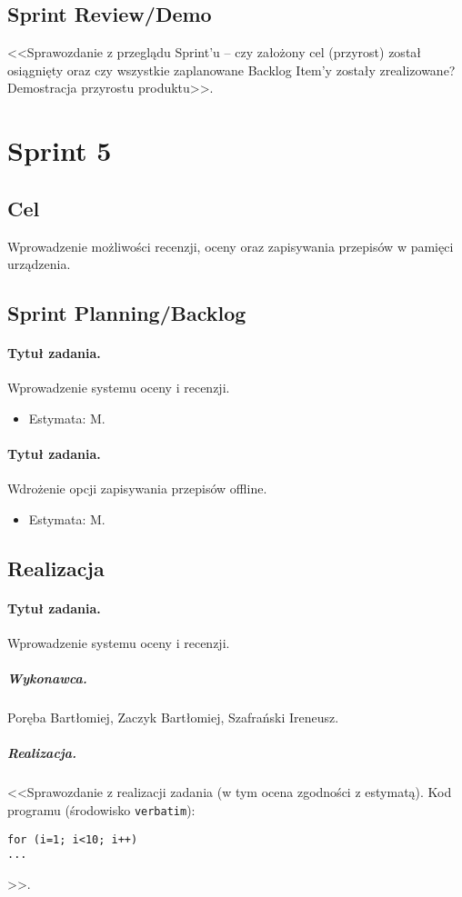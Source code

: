 \documentclass[a4paper]{article}
\begin{document}
\subsection{Sprint Review/Demo}
<<Sprawozdanie z przeglądu Sprint'u -- czy założony cel (przyrost) został osiągnięty oraz czy wszystkie zaplanowane Backlog Item'y zostały zrealizowane? Demostracja przyrostu produktu>>.


\section{Sprint 5}

\subsection{Cel} Wprowadzenie możliwości recenzji, oceny oraz zapisywania przepisów w pamięci urządzenia.

\subsection{Sprint Planning/Backlog}

\paragraph{Tytuł zadania.} Wprowadzenie systemu oceny i recenzji.
\begin{itemize}
	\item Estymata: M.
\end{itemize}

\paragraph{Tytuł zadania.} Wdrożenie opcji zapisywania przepisów offline.
\begin{itemize}
	\item Estymata: M.
\end{itemize}


\subsection{Realizacja}

\paragraph{Tytuł zadania.} Wprowadzenie systemu oceny i recenzji.
\subparagraph{Wykonawca.} Poręba Bartłomiej, Zaczyk Bartłomiej, Szafrański Ireneusz.
\subparagraph{Realizacja.} <<Sprawozdanie z realizacji zadania (w tym ocena zgodności z estymatą). Kod programu (środowisko \texttt{verbatim}): \begin{verbatim}
for (i=1; i<10; i++)
...
\end{verbatim}>>.
\end{document}
